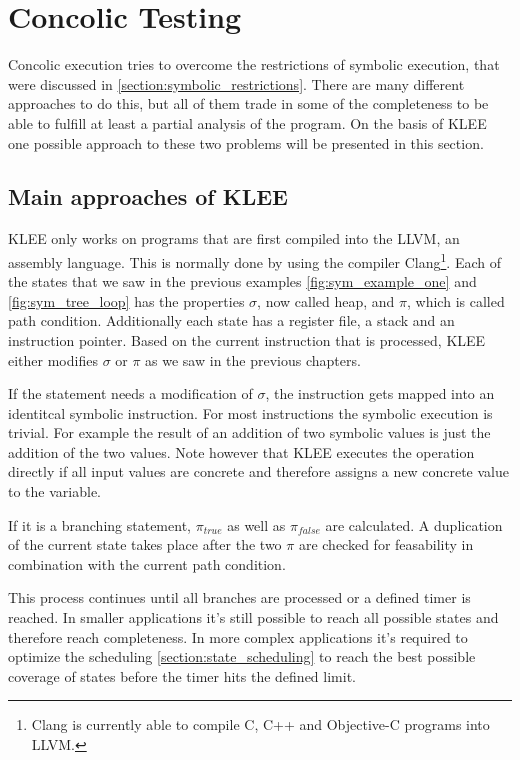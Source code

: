 \section{Concolic Testing} \label{section:concolic_testing}
Concolic execution tries to overcome the restrictions of symbolic execution, that were discussed in \ref{section:symbolic_restrictions}. There are many different approaches to do this, but all of them trade in some of the completeness to be able to fulfill at least a partial analysis of the program.
On the basis of KLEE \cite{Cadar:2008:KUA:1855741.1855756} one possible approach to these two problems will be presented in this section.

\subsection{Main approaches of KLEE}
KLEE only works on programs that are first compiled into the LLVM, an assembly language. This is normally done by using the compiler Clang\footnote{Clang is currently able to compile C, C++  and Objective-C programs into LLVM.}. 
Each of the states that we saw in the previous examples \ref{fig:sym_example_one} and \ref{fig:sym_tree_loop} has the properties $\sigma$, now called heap, and $\pi$, which is called path condition. Additionally each state has a register file, a stack and an instruction pointer. Based on the current instruction that is processed, KLEE either modifies $\sigma$ or $\pi$ as we saw in the previous chapters.

If the statement needs a modification of $\sigma$, the instruction gets mapped into an identitcal symbolic instruction. For most instructions the symbolic execution is trivial. For example the result of an addition of two symbolic values is just the addition of the two values. Note however that KLEE executes the operation directly if all input values are concrete and therefore assigns a new concrete value to the variable.

If it is a branching statement, $\pi_{true}$ as well as $\pi_{false}$ are calculated. A duplication of the current state takes place after the two $\pi$ are checked for feasability in combination with the current path condition.

This process continues until all branches are processed or a defined timer is reached. In smaller applications it's still possible to reach all possible states and therefore reach completeness. In more complex applications it's required to optimize the scheduling \ref{section:state_scheduling} to reach the best possible coverage of states before the timer hits the defined limit.
